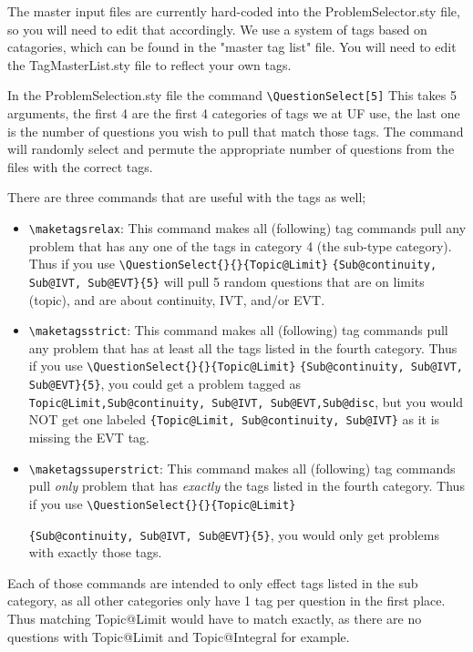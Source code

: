 \documentclass[•]{article}
\begin{document}
The master input files are currently hard-coded into the ProblemSelector.sty file, so you will need to edit that accordingly. We use a system of tags based on catagories, which can be found in the "master tag list" file. You will need to edit the TagMasterList.sty file to reflect your own tags.

In the ProblemSelection.sty file the command \verb|\QuestionSelect[5]| This takes 5 arguments, the first 4 are the first 4 categories of tags we at UF use, the last one is the number of questions you wish to pull that match those tags. The command will randomly select and permute the appropriate number of questions from the files with the correct tags.

There are three commands that are useful with the tags as well;
\begin{itemize}
\item \verb|\maketagsrelax|: This command makes all (following) tag commands pull any problem that has any one of the tags in category 4 (the sub-type category). Thus if you use \verb|\QuestionSelect{}{}{Topic@Limit}|
\verb|{Sub@continuity, Sub@IVT, Sub@EVT}{5}| will pull 5 random questions that are on limits (topic), and are about continuity, IVT, and/or EVT.

\item \verb|\maketagsstrict|: This command makes all (following) tag commands pull any problem that has at least all the tags listed in the fourth category. Thus if you use \verb|\QuestionSelect{}{}{Topic@Limit}|
\verb|{Sub@continuity, Sub@IVT, Sub@EVT}{5}|, you could get a problem tagged as \verb|Topic@Limit,Sub@continuity, Sub@IVT, Sub@EVT,Sub@disc|, but you would NOT get one labeled \verb|{Topic@Limit, Sub@continuity, Sub@IVT}| as it is missing the EVT tag.

\item \verb|\maketagssuperstrict|: This command makes all (following) tag commands pull \textit{only} problem that has \textit{exactly} the tags listed in the fourth category. Thus if you use \verb|\QuestionSelect{}{}{Topic@Limit}|

\verb|{Sub@continuity, Sub@IVT, Sub@EVT}{5}|, you would only get problems with exactly those tags.
\end{itemize} 

Each of those commands are intended to only effect tags listed in the sub category, as all other categories only have 1 tag per question in the first place. Thus matching Topic@Limit would have to match exactly, as there are no questions with Topic@Limit and Topic@Integral for example.
\end{document}
